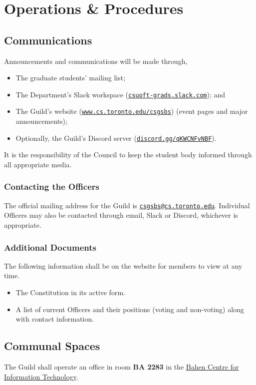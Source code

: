 \section{Operations \& Procedures}

\subsection{Communications}\label{sec:communications}
Announcements and communications will be made through,
\begin{itemize}
      \item The graduate students' mailing list;
      \item The Department's Slack workspace
            (\href{https://csuoft-grads.slack.com}{\texttt{csuoft-grads.slack.com}}); and
      \item The Guild's website
            (\href{https://www.cs.toronto.edu/csgsbs}{\texttt{www.cs.toronto.edu/csgsbs}})
            (event pages and major announcements);
      \item Optionally, the Guild's Discord server
            (\href{https://discord.gg/qKWCNFvNBF}{\texttt{discord.gg/qKWCNFvNBF}}).
\end{itemize}
It is the responsibility of the Council to keep the student body informed through all appropriate media.

\subsubsection{Contacting the Officers}
The official mailing address for the Guild is
\href{mailto:csgsbs@cs.toronto.edu}{\texttt{csgsbs@cs.toronto.edu}}. Individual
Officers may also be contacted through email, Slack or Discord, whichever is
appropriate.

\subsubsection{Additional Documents}
The following information shall be on the website for members to view at any
time.

\begin{itemize}
      \item The Constitution in its active form.
      \item A list of current Officers and their positions (voting and non-voting) along
            with contact information.
\end{itemize}

\subsection{Communal Spaces}\label{sec:communal-spaces}
The Guild shall operate an office in room \textbf{BA 2283} in the
\href{https://map.utoronto.ca/?id=1809#!m/494470}{Bahen Centre for Information
      Technology}.

